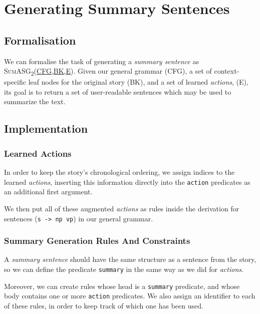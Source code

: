 \section{Generating Summary Sentences}
\label{sec:gen_summary_sentences}

\subsection{Formalisation}

We can formalise the task of generating a \textit{summary sentence} as \textsc{SumASG\textsubscript{2}(\underline{CFG},\underline{BK},\underline{E})}. Given our general grammar (\textsc{CFG}), a set of context-specific leaf nodes for the original story (\textsc{BK}), and a set of learned \textit{actions}, (\textsc{E}), its goal is to return a set of user-readable sentences which may be used to summarize the text.

\subsection{Implementation}

\subsubsection{Learned Actions}

In order to keep the story's chronological ordering, we assign indices to the learned \textit{actions}, inserting this information directly into the \texttt{action} predicates as an additional first argument.

We then put all of these augmented \textit{actions} as rules inside the derivation for sentences (\texttt{s -> np vp}) in our general grammar. 

\subsubsection{Summary Generation Rules And Constraints}

A \textit{summary sentence} should have the same structure as a sentence from the story, so we can define the predicate \texttt{summary} in the same way as we did for \textit{actions}.

Moreover, we can create rules whose head is a \texttt{summary} predicate, and whose body contains one or more \texttt{action} predicates. We also assign an identifier to each of these rules, in order to keep track of which one has been used.

